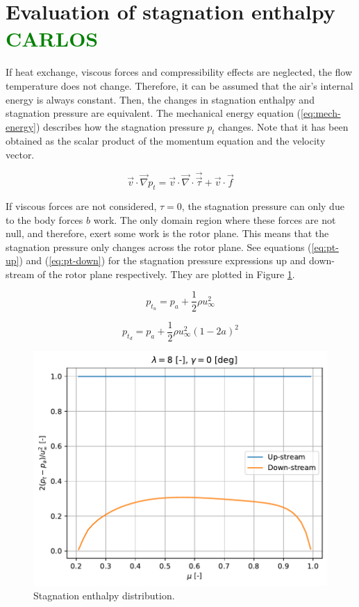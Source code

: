 \section{Evaluation of stagnation enthalpy \textcolor{green}{CARLOS}}

If heat exchange, viscous forces and compressibility effects are neglected, the flow temperature does not change. Therefore, it can be assumed that the air's internal energy is always constant. Then, the changes in stagnation enthalpy and stagnation pressure are equivalent. The mechanical energy equation (\ref{eq:mech-energy}) describes how the stagnation pressure $ p_t $ changes. Note that it has been obtained as the scalar product of the momentum equation and the velocity vector.

\begin{equation}
	\vec{v} \cdot \vec{\nabla} p_t = \vec{v} \cdot \vec{\nabla} \cdot \vec{\vec{\tau}} + \vec{v} \cdot \vec{f}
	\label{eq:mech-energy}
\end{equation}

If viscous forces are not considered, $ \tau = 0 $, the stagnation pressure can only due to the body forces $ b $ work. The only domain region where these forces are not null, and therefore, exert some work is the rotor plane. This means that the stagnation pressure only changes across the rotor plane. See equations (\ref{eq:pt-up}) and (\ref{eq:pt-down}) for the stagnation pressure expressions up and down-stream of the rotor plane respectively. They are plotted in Figure \ref{img:pt}.

\begin{equation}
	p_{t_u} = p_a + \frac{1}{2} \rho u_{\infty}^2
	\label{eq:pt-up}
\end{equation}

\begin{equation}
	p_{t_d} = p_a + \frac{1}{2} \rho u_{\infty}^2 (1-2a)^2
	\label{eq:pt-down}
\end{equation}

\begin{figure}[htbp]
	\centering
	\includegraphics[height=0.45\textheight]{./img/stagnation-enthalpy.pdf}
	\caption{Stagnation enthalpy distribution.}
	\label{img:pt}
\end{figure}

